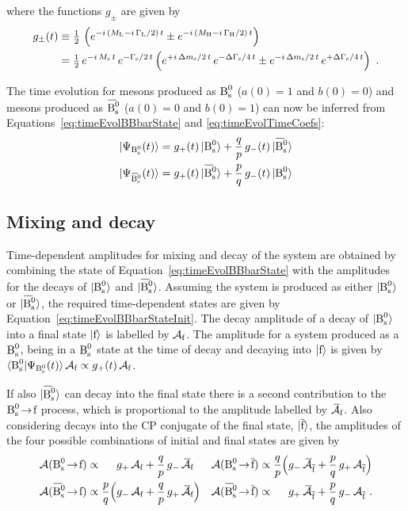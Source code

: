 where the functions $g_\pm$ are given by
\begin{align}
  \label{eq:timeEvolQp}
  g_\pm(t) &\equiv \tfrac{1}{2}\, \left( e^{-i\,(M_\text{L}-i\,\Gamma_\text{L}/2)\,t} \pm e^{-i\,(M_\text{H}-i\,\Gamma_\text{H}/2)\,t} \right) \\
           &= \tfrac{1}{2}\, e^{-i\,M_\text{s}\,t}\, e^{-\Gamma_\text{s}/2\,t}
                \left( e^{+i\,\Delta m_\text{s}/2\,t}\, e^{-\Delta\Gamma_\text{s}/4\,t} \pm e^{-i\,\Delta m_\text{s}/2\,t}\, e^{+\Delta\Gamma_\text{s}/4\,t} \right) \nonumber
           \ .
\end{align}

The time evolution for mesons produced as $\text{B}_\text{s}^0$ ($a(0)=1$ and $b(0)=0$) and mesons produced as $\Bsbar$ ($a(0)=0$ and $b(0)=1$) can now be
inferred from Equations~\ref{eq:timeEvolBBbarState} and \ref{eq:timeEvolTimeCoefs}:
\begin{subequations}
  \label{eq:timeEvolBBbarStateInit}
  \begin{align}
    |\Psi_{\Bs}(t)\rangle    = g_+(t)\,\Bsst    + \qp\,g_-(t)\,\Bsbarst \\
    |\Psi_{\Bsbar}(t)\rangle = g_+(t)\,\Bsbarst + \pq\,g_-(t)\,\Bsst
  \end{align}
\end{subequations}

\subsection{Mixing and decay}

Time-dependent amplitudes for mixing and decay of the \BsBsbar{} system are obtained by combining the state of
Equation~\ref{eq:timeEvolBBbarState} with the amplitudes for the decays of $|\text{B}_\text{s}^0\rangle$ and $\Bsbarst$. Assuming the system is produced as
either $|\text{B}_\text{s}^0\rangle$ or $\Bsbarst$, the required time-dependent states are given by Equation~\ref{eq:timeEvolBBbarStateInit}. The decay amplitude
of a decay of $|\text{B}_\text{s}^0\rangle$ into a final state $|\text{f}\rangle$ is labelled by $\mathcal{A}_{\text{f}}$. The amplitude for a system produced as a $\text{B}_\text{s}^0$, being in a $\text{B}_\text{s}^0$
state at the time of decay and decaying into $|\text{f}\rangle$ is given by $\langle\text{B}_\text{s}^0|\Psi_{\text{B}_\text{s}^0}(t)\rangle\,\mathcal{A}_{\text{f}} \propto g_+(t)\,\mathcal{A}_{\text{f}}$.

If also $\Bsbarst$ can decay into the final state there is a second contribution to the $\text{B}_\text{s}^0\!\to\!{\text{f}}$ process, which is proportional to the
amplitude labelled by $\kern 0.23em \overline{\kern -0.23em \mathcal{A}}_{\text{f}}$. Also considering decays into the CP conjugate of the final state, $|\overline{\text{f}}\rangle$, the amplitudes of the four
possible combinations of initial and final states are given by
\begin{equation}
  \label{eq:mixDecayAmps}
  \begin{alignedat}{4}
    \mathcal{A}(\Bstof) &\propto& & g_+\, \Af + \qp\, g_-\, \Abarf &
    \quad
    \mathcal{A}(\Bstofbar) &\propto& \;\qp \Big( & g_-\, \Abarfbar + \pq\, g_+\, \Afbar \Big)
    \\
    \mathcal{A}(\Bsbartof) &\propto& \;\pq \Big( & g_-\, \Af + \qp\, g_+\, \Abarf \Big) &
    \mathcal{A}(\Bsbartofbar) &\propto& & g_+\, \Abarfbar + \pq\, g_-\, \Afbar
    \ .
  \end{alignedat}
\end{equation}

